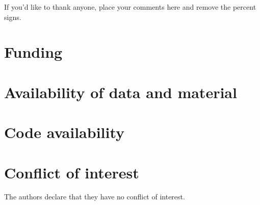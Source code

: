 \documentclass[smallextended]{svjour3}       %
\begin{document}
\begin{acknowledgements}
If you'd like to thank anyone, place your comments here
and remove the percent signs.
\end{acknowledgements}

\section*{Funding}

\section*{Availability of data and material}

\section*{Code availability}
%
 \section*{Conflict of interest}
 The authors declare that they have no conflict of interest.


\printbibliography[heading=bibintoc]

%
%
\end{document}

